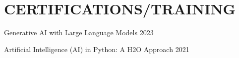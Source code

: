 \documentclass{my_cv}
\begin{document}
\section{CERTIFICATIONS/TRAINING}

\item[]
    Generative AI with Large Language Models 2023 
    \vspace{-6pt}
    \begin{itemize}
    \end{itemize} 
\item[]
    Artificial Intelligence (AI) in Python: A H2O Approach 2021 
    \vspace{-6pt}
    \begin{itemize}
    \end{itemize} 
\end{document}
